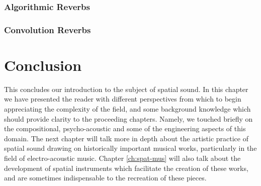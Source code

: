
\subsubsection{Algorithmic Reverbs}
\subsubsection{Convolution Reverbs}

\section{Conclusion}
This concludes our introduction to the subject of spatial sound. In this chapter we have presented the reader with different perspectives from which to begin appreciating the complexity of the field, and some background knowledge which should provide clarity to the proceeding chapters. Namely, we touched briefly on the compositional, psycho-acoustic and some of the engineering aspects of this domain. The next chapter will talk more in depth about the artistic practice of spatial sound drawing on historically important musical works, particularly in the field of electro-acoustic music. Chapter \ref{ch:spat-mus} will also talk about the development of spatial instruments which facilitate the creation of these works, and are sometimes indispensable to the recreation of these pieces.